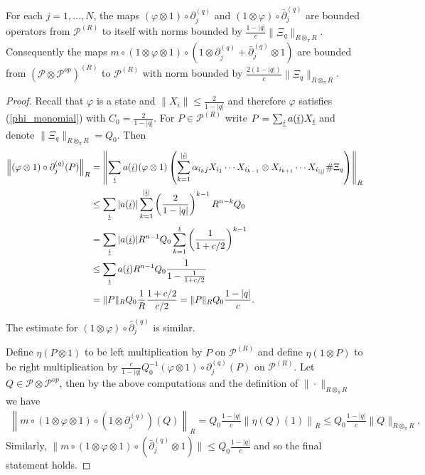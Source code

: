 \begin{lem}\label{bounded_adjoint}
For each $j=1,\ldots,N$, the maps $(\varphi\otimes 1)\circ\partial_j^{(q)}$ and $(1\otimes\varphi)\circ\bar{\partial}_j^{(q)}$ are bounded operators from $\mathscr{P}^{(R)}$ to itself with norms bounded by $\frac{1-|q|}{c}\|\Xi_q\|_{R\otimes_\pi R}$. Consequently the maps $m\circ(1\otimes\varphi\otimes 1)\circ\left(1\otimes\partial_j^{(q)} +\bar{\partial}_j^{(q)}\otimes 1\right)$ are bounded from $\left(\mathscr{P}\otimes\mathscr{P}^{op}\right)^{(R)}$ to $\mathscr{P}^{(R)}$ with norm bounded by $\frac{2(1-|q|)}{c}\|\Xi_q\|_{R\otimes_\pi R}$.
\end{lem}
\begin{proof}
Recall that $\varphi$ is a state and $\|X_i\| \leq \frac{2}{1-|q|}$ and therefore $\varphi$ satisfies (\ref{phi_monomial}) with $C_0=\frac{2}{1-|q|}$. For $P\in \mathscr{P}^{(R)}$ write $P=\sum_{\underline{i}} a(\underline{i}) X_{\underline{i}}$ and denote $\|\Xi_q\|_{R\otimes_\pi R}=Q_0$. Then
	\begin{align*}
		\left\| (\varphi\otimes 1)\circ\partial_j^{(q)}(P)\right\|_R  &= \left\| \sum_{\underline{i}} a(\underline{i})(\varphi\otimes 1)\left( \sum_{k=1}^{|\underline{i}|} \alpha_{i_k j} X_{i_1}\cdots X_{i_{k-1}} \otimes X_{i_{k+1}}\cdots X_{i_{|\underline{i}|}}\#\Xi_q\right)\right\|_R \\
										&\leq \sum_{\underline{i}} |a(\underline{i})| \sum_{k=1}^{|\underline{i}|} \left(\frac{2}{1-|q|}\right)^{k-1} R^{n-k}Q_0 \\
										&=\sum_{\underline{i}} |a(\underline{i})| R^{n-1} Q_0\sum_{k=1}^{\underline{i}} \left(\frac{1}{1+c/2}\right)^{k-1}\\
					&\leq \sum_{\underline{i}} a(\underline{i}) R^{n-1}Q_0 \frac{1}{1-\frac{1}{1+c/2}} \\
					&=\|P\|_RQ_0 \frac{1}{R} \frac{1+c/2}{c/2} = \|P\|_R Q_0\frac{1-|q|}{c}.
	\end{align*}
The estimate for $(1\otimes \varphi)\circ\bar{\partial}_j^{(q)}$ is similar.\par
Define $\eta(P\otimes 1)$ to be left multiplication by $P$ on $\mathscr{P}^{(R)}$ and define $\eta(1\otimes P)$ to be right multiplication by $\frac{c}{1-|q|}Q_0^{-1}(\varphi\otimes 1)\circ\partial_j^{(q)}(P)$ on $\mathscr{P}^{(R)}$. Let $Q\in \mathscr{P}\otimes\mathscr{P}^{op}$, then by the above computations and the definition of $\|\cdot\|_{R\otimes_\pi R}$ we have
	\begin{align*}
		\left\|m\circ(1\otimes\varphi\otimes 1)\circ(1\otimes\partial_j^{(q)})(Q)\right\|_R = Q_0\frac{1-|q|}{c}\left\| \eta(Q)(1)\right\|_R\leq Q_0\frac{1-|q|}{c}\|Q\|_{R\otimes_\pi R}.
	\end{align*}
Similarly, $\| m\circ(1\otimes\varphi\otimes 1)\circ(\bar{\partial}_j^{(q)}\otimes 1)\|\leq Q_0\frac{1-|q|}{c}$ and so the final statement holds.
\end{proof}

